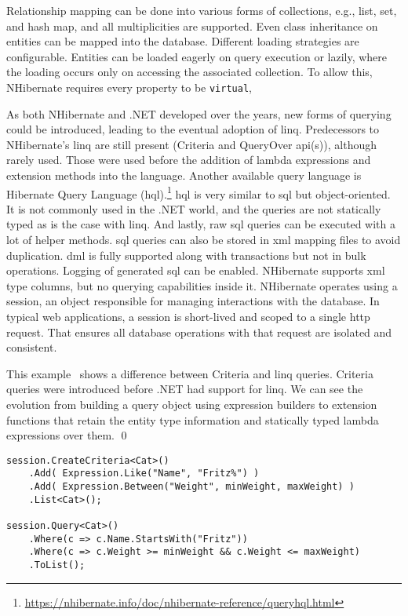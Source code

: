 Relationship mapping can be done into various forms of collections, e.g., list, set, and hash map, and all multiplicities are supported. Even class inheritance on entities can be mapped into the database. Different loading strategies are configurable. Entities can be loaded eagerly on query execution or lazily, where the loading occurs only on accessing the associated collection. To allow this, NHibernate requires every property to be \texttt{virtual},

As both NHibernate and .NET developed over the years, new forms of querying could be introduced, leading to the eventual adoption of \acrshort{linq}. Predecessors to NHibernate's \acrshort{linq} are still present (Criteria and QueryOver \acrshort{api}(s)), although rarely used. Those were used before the addition of lambda expressions and extension methods into the language. Another available query language is Hibernate Query Language (\acrshort{hql}).\footnote{\url{https://nhibernate.info/doc/nhibernate-reference/queryhql.html}} \acrshort{hql} is very similar to \acrshort{sql} but object-oriented. It is not commonly used in the .NET world, and the queries are not statically typed as is the case with \acrshort{linq}. And lastly, raw \acrshort{sql} queries can be executed with a lot of helper methods. \acrshort{sql} queries can also be stored in \acrshort{xml} mapping files to avoid duplication. \acrshort{dml} is fully supported along with transactions but not in bulk operations. Logging of generated \acrshort{sql} can be enabled. NHibernate supports \acrshort{xml} type columns, but no querying capabilities inside it. NHibernate operates using a session, an object responsible for managing interactions with the database. In typical web applications, a session is short-lived and scoped to a single \acrshort{http} request. That ensures all database operations with that request are isolated and consistent.

\begin{example}
\small
This example~\cite{nhibernate} shows a difference between Criteria and \acrshort{linq} queries. Criteria queries were introduced before .NET had support for \acrshort{linq}. We can see the evolution from building a query object using expression builders to extension functions that retain the entity type information and statically typed lambda expressions over them. 
\qed

\begin{lstlisting}[language=CSharp]
session.CreateCriteria<Cat>()
    .Add( Expression.Like("Name", "Fritz%") )
    .Add( Expression.Between("Weight", minWeight, maxWeight) )
    .List<Cat>();

session.Query<Cat>()
    .Where(c => c.Name.StartsWith("Fritz"))
    .Where(c => c.Weight >= minWeight && c.Weight <= maxWeight)
    .ToList();
\end{lstlisting}
\end{example}

